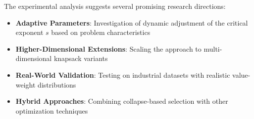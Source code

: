 \documentclass[11pt]{article}
\theoremstyle{remark}
\theoremstyle{definition}
\begin{document}
The experimental analysis suggests several promising research directions:

\begin{itemize}
\item \textbf{Adaptive Parameters}: Investigation of dynamic adjustment of the critical exponent $s$ based on problem characteristics
\item \textbf{Higher-Dimensional Extensions}: Scaling the approach to multi-dimensional knapsack variants
\item \textbf{Real-World Validation}: Testing on industrial datasets with realistic value-weight distributions
\item \textbf{Hybrid Approaches}: Combining collapse-based selection with other optimization techniques
\end{itemize}
\end{document}
